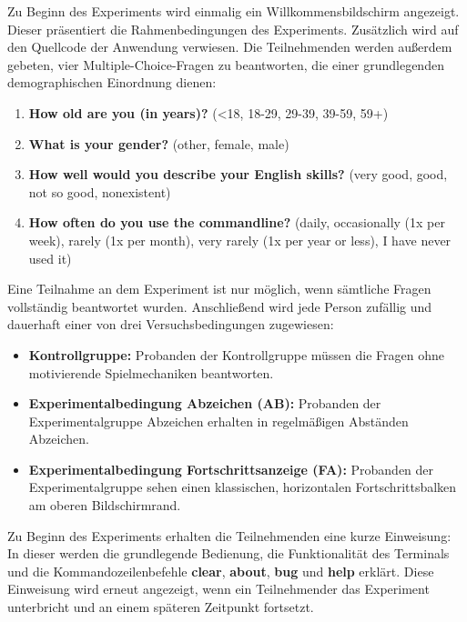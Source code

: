 Zu Beginn des Experiments wird einmalig ein Willkommensbildschirm angezeigt. Dieser präsentiert die Rahmenbedingungen des Experiments. Zusätzlich wird auf den Quellcode der Anwendung verwiesen. Die Teilnehmenden werden außerdem gebeten, vier Multiple-Choice-Fragen zu beantworten, die einer grundlegenden demographischen Einordnung dienen:

\begin{enumerate}\label{demography}
	 \item \textbf{How old are you (in years)?} (<18, 18-29, 29-39, 39-59, 59+)
     \item \textbf{What is your gender?} (other, female, male)
     \item \textbf{How well would you describe your English skills?} (very good, good, not so good, nonexistent)
     \item \textbf{How often do you use the commandline?} (daily, occasionally (1x per week), rarely (1x per month), very rarely (1x per year or less), I have never used it)
\end{enumerate}

Eine Teilnahme an dem Experiment ist nur möglich, wenn sämtliche Fragen vollständig beantwortet wurden. Anschließend wird jede Person zufällig und dauerhaft einer von drei Versuchsbedingungen zugewiesen:


\begin{itemize}
	\item \textbf{Kontrollgruppe:} Probanden der Kontrollgruppe müssen die Fragen ohne motivierende Spielmechaniken beantworten.
	 
    \item \textbf{Experimentalbedingung Abzeichen (AB):} Probanden der Experimentalgruppe Abzeichen erhalten in regelmäßigen Abständen Abzeichen.

    \item \textbf{Experimentalbedingung Fortschrittsanzeige (FA):} Probanden der Experimentalgruppe sehen einen klassischen, horizontalen Fortschrittsbalken am oberen Bildschirmrand.
\end{itemize}

Zu Beginn des Experiments erhalten die Teilnehmenden eine kurze Einweisung: In dieser werden die grundlegende Bedienung, die Funktionalität des Terminals und die Kommandozeilenbefehle \textbf{clear}, \textbf{about}, \textbf{bug} und \textbf{help} erklärt. Diese Einweisung wird erneut angezeigt, wenn ein Teilnehmender das Experiment unterbricht und an einem späteren Zeitpunkt fortsetzt.

